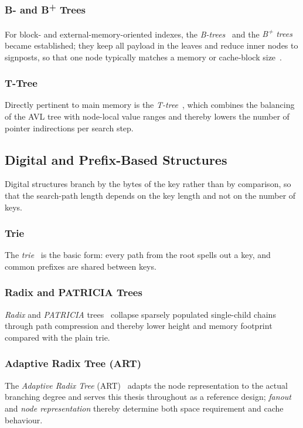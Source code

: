 \subsubsection{B- and B\texorpdfstring{\textsuperscript{+}}{+} Trees}
For block- and external-memory-oriented indexes, the \emph{B-trees}~\cite{bayer1972btree} and the
\emph{B\textsuperscript{+} trees}~\cite{comer1979btree} became established; they keep all payload in
the leaves and reduce inner nodes to signposts, so that one node typically matches a memory or
cache-block size~\cite{graefe2001btree,hankins2003nodesize}.

\subsubsection{T-Tree}
Directly pertinent to main memory is the \emph{T-tree}~\cite{lehman1986ttree}, which combines the
balancing of the AVL tree with node-local value ranges and thereby lowers the number of pointer
indirections per search step.

\subsection{Digital and Prefix-Based Structures}\label{ssec:digital}
Digital structures branch by the bytes of the key rather than by comparison, so that the search-path
length depends on the key length and not on the number of keys.

\subsubsection{Trie}
The \emph{trie}~\cite{delabriandais1959trie,fredkin1960trie} is the basic form: every path from the
root spells out a key, and common prefixes are shared between keys.

\subsubsection{Radix and PATRICIA Trees}
\emph{Radix} and \emph{PATRICIA} trees~\cite{morrison1968patricia} collapse sparsely populated
single-child chains through path compression and thereby lower height and memory footprint compared
with the plain trie.

\subsubsection{Adaptive Radix Tree (ART)}
The \emph{Adaptive Radix Tree} (ART)~\cite{leis2013art} adapts the node representation to the actual
branching degree and serves this thesis throughout as a reference design; \emph{fanout} and
\emph{node representation} thereby determine both space requirement and cache behaviour.

